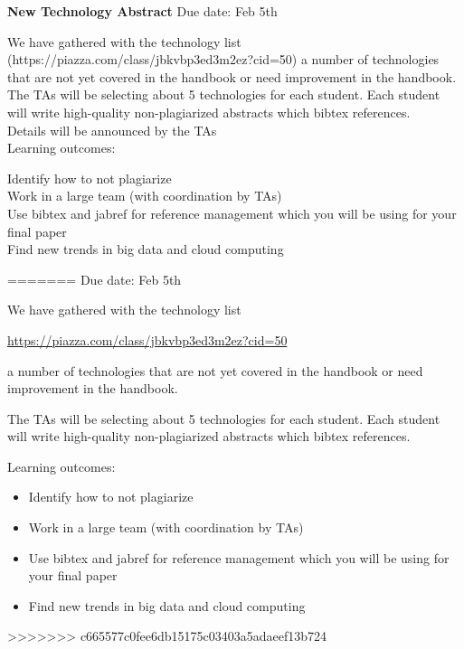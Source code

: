 \begin{exercise}
\begin{exercise}\label{a:e6161-new-tech-abstracts}
 
{\bf New Technology Abstract} Due date: Feb 5th

We have gathered with the technology list (https://piazza.com/class/jbkvbp3ed3m2ez?cid=50) a number of technologies that are not yet covered in the handbook or need improvement in the handbook.\\

The TAs will be selecting about 5 technologies for each student. Each student will write high-quality non-plagiarized abstracts which bibtex references.\\
 
Details will be announced by the TAs\\
 
Learning outcomes:

\noindent Identify how to not plagiarize\\
Work in a large team (with coordination by TAs)\\
Use bibtex and jabref for reference management which you will be using for your final paper\\
Find new trends in big data and cloud computing\\

\end{exercise}
=======
Due date: Feb 5th

We have gathered with the technology list 

\url{https://piazza.com/class/jbkvbp3ed3m2ez?cid=50}

a number of technologies that are not yet covered in the handbook or
need improvement in the handbook.

The TAs will be selecting about 5 technologies for each student. Each
student will write high-quality non-plagiarized abstracts which bibtex
references.
 
Learning outcomes:

\begin{itemize}

\item Identify how to not plagiarize
\item Work in a large team (with coordination by TAs)
\item Use bibtex and jabref for reference management which you will be using for your final paper
\item Find new trends in big data and cloud computing

\end{itemize}
>>>>>>> c665577c0fee6db15175c03403a5adaeef13b724

\end{exercise}
